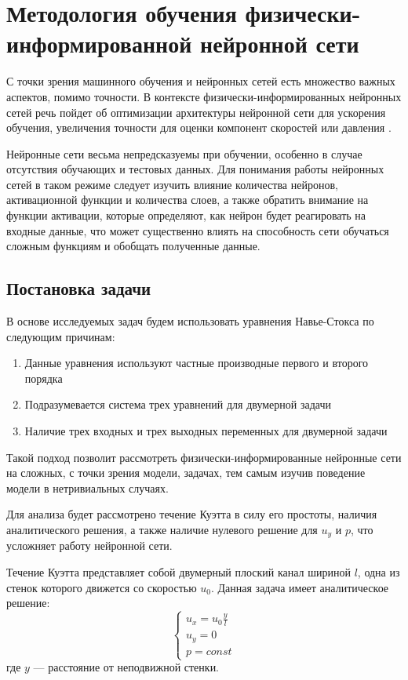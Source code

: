 \chapter{Методология обучения физически-информированной нейронной сети}
С точки зрения машинного обучения и нейронных сетей есть множество важных аспектов,
помимо точности. В контексте физически-информированных нейронных сетей речь пойдет
об оптимизации архитектуры нейронной сети для ускорения обучения, увеличения точности
для оценки компонент скоростей или давления \cite{Tommaso2024pinn}.

Нейронные сети весьма непредсказуемы при обучении, особенно в случае отсутствия
обучающих и тестовых данных. Для понимания работы нейронных сетей в таком режиме
следует изучить влияние количества нейронов, активационной функции и количества слоев,
а также обратить внимание на функции активации, которые определяют,
как нейрон будет реагировать на входные данные, что может существенно влиять на способность
сети обучаться сложным функциям и обобщать полученные данные.
\section{Постановка задачи}
В основе исследуемых задач будем использовать уравнения Навье-Стокса по следующим
причинам:
\begin{enumerate}
    \item Данные уравнения используют частные производные первого и второго порядка
    \item Подразумевается система трех уравнений для двумерной задачи
    \item Наличие трех входных и трех выходных переменных для двумерной задачи
\end{enumerate}
Такой подход позволит рассмотреть физически-информированные нейронные сети на сложных,
с точки зрения модели, задачах, тем самым изучив поведение модели в нетривиальных случаях.

Для анализа будет рассмотрено течение Куэтта в силу его простоты, наличия аналитического
решения, а также наличие нулевого решение для $u_y$ и $p$, что усложняет работу нейронной
сети.

Течение Куэтта представляет собой двумерный плоский канал шириной $l$, одна из стенок которого 
движется со скоростью $u_0$. Данная задача имеет аналитическое решение:
\begin{equation}
    \begin{cases}
        u_x = u_0 \frac{y}{l} \\
        u_y = 0 \\
        p = const
    \end{cases}
\end{equation}
где $y$ --- расстояние от неподвижной стенки.

